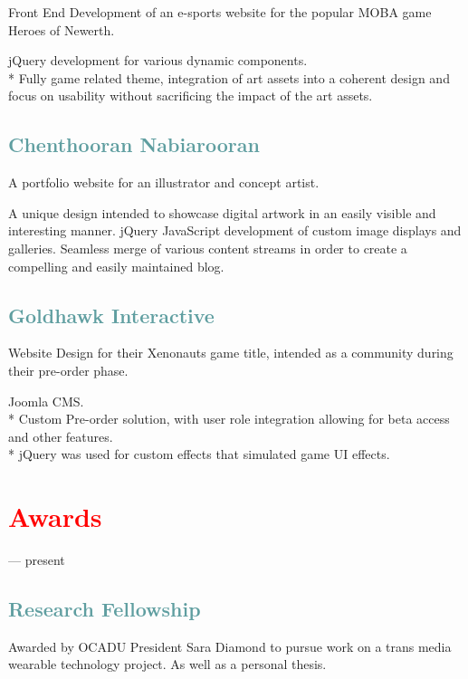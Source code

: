 Front End Development of an e-sports website for the popular MOBA game Heroes of Newerth.

jQuery development for various dynamic components.\\*
Fully game related theme, integration of art assets into a coherent design and focus on usability without sacrificing the impact of the art assets.

\subsection{\textcolor{CadetBlue}{\LARGE{Chenthooran Nabiarooran}}}

A portfolio website for an illustrator and concept artist.

A unique design intended to showcase digital artwork in an easily visible and interesting manner.
jQuery JavaScript development of custom image displays and galleries. Seamless merge of various content streams in order to create a compelling and easily maintained blog.

\subsection{\textcolor{CadetBlue}{\LARGE{Goldhawk Interactive}}}
\marginnote{\textcolor{gray}{2010}}

Website Design for their Xenonauts game title, intended as a community during their pre-order phase.

Joomla CMS.\\*
Custom Pre-order solution, with user role integration allowing for beta access and other features.\\*
jQuery was used for custom effects that simulated game UI effects.

\newpage
\section{\textcolor{red}{Awards}}
 --- present 
\subsection{\textcolor{CadetBlue}{\LARGE{Research Fellowship}}}
Awarded by OCADU President Sara Diamond to pursue work on a trans media wearable technology project. As well as a personal thesis.

